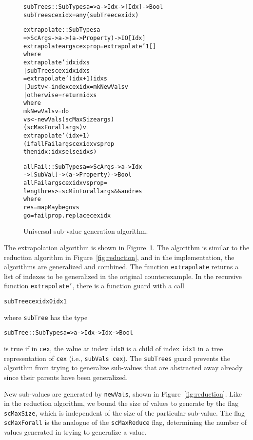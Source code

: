 \documentclass{sigplanconf}
\newenvironment{code}{\begin{alltt}\footnotesize}{\end{alltt}}
\newcommand{\ttp}[1]{\texttt{#1}}
\begin{document}
\begin{figure}
  \begin{code}
subTrees :: SubTypes a => a -> Idx -> [Idx] -> Bool
subTrees cex idx = any (subTree cex idx)

extrapolate :: SubTypes a
  => ScArgs -> a -> (a -> Property) -> IO [Idx]
extrapolate args cex prop = extrapolate' 1 []
  where
  extrapolate' idx idxs
    | subTrees cex idx idxs
    = extrapolate' (idx+1) idxs
    | Just v <- index cex idx = mkNewVals v
    | otherwise = return idxs
    where
    mkNewVals v = do
      vs <- newVals (scMaxSize args)
                    (scMaxForall args) v
      extrapolate' (idx+1)
        (if allFail args cex idx vs prop
           then idx:idxs else idxs)

allFail :: SubTypes a => ScArgs -> a -> Idx
  -> [SubVal] -> (a -> Property) -> Bool
allFail args cex idx vs prop =
  length res >= scMinForall args && and res
  where
  res  = mapMaybe go vs
  go   = fail prop . replace cex idx
  \end{code}
  \caption{Universal sub-value generation algorithm.}
  \label{fig:universal}
\end{figure}

The extrapolation algorithm is shown in Figure~\ref{fig:universal}.  The
algorithm is similar to the reduction algorithm in Figure~\ref{fig:reduction},
and in the implementation, the algorithms are generalized and combined.  The
function \ttp{extrapolate} returns a list of indexes to be generalized in the
original counterexample.  In the recursive function \ttp{extrapolate'}, there is
a function guard with a call
%
\begin{code}
subTree cex idx0 idx1
\end{code}
%
\noindent
where \ttp{subTree} has the type
%
\begin{code}
subTree :: SubTypes a => a -> Idx -> Idx -> Bool
\end{code}
%
\noindent
is true if in \ttp{cex}, the value at index \ttp{idx0} is a child of index
\ttp{idx1} in a tree representation of \ttp{cex} (i.e., \ttp{subVals cex}).  The
\ttp{subTrees} guard prevents the algorithm from trying to generalize sub-values
that are abstracted away already since their parents have been generalized.

New sub-values are generated by \ttp{newVals}, shown in
Figure~\ref{fig:reduction}.  Like in the reduction algorithm, we bound the size
of values to generate by the flag \ttp{scMaxSize}, which is independent of the
size of the particular sub-value.  The flag \ttp{scMaxForall} is the analogue of
the \ttp{scMaxReduce} flag, determining the number of values generated in trying
to generalize a value.
\end{document}
